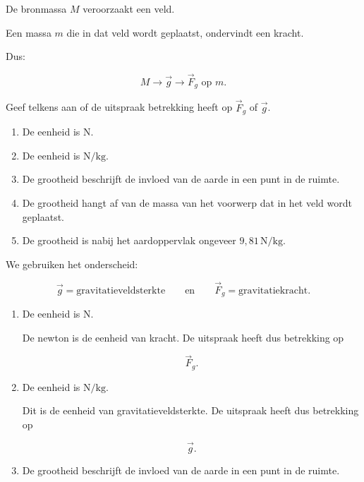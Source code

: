 \documentclass{ximera}
\begin{document}
De bronmassa $M$ veroorzaakt een veld.

Een massa $m$ die in dat veld wordt geplaatst, ondervindt een kracht.

Dus:

\[
\boxed{
M
\longrightarrow
\vec g
\longrightarrow
\vec F_g\text{ op }m.
}
\]


\begin{oefening}{\oefB\ESS}

Geef telkens aan of de uitspraak betrekking heeft op $\vec F_g$ of
$\vec g$.

\begin{enumerate}
  \item De eenheid is $\mathrm N$.
  \item De eenheid is $\mathrm{N/kg}$.
  \item De grootheid beschrijft de invloed van de aarde in een punt in
        de ruimte.
  \item De grootheid hangt af van de massa van het voorwerp dat in het
        veld wordt geplaatst.
  \item De grootheid is nabij het aardoppervlak ongeveer
        $9{,}81\,\mathrm{N/kg}$.
\end{enumerate}

\begin{oplossing}

      We gebruiken het onderscheid:
      
      \[
      \boxed{
      \vec g
      =
      \text{gravitatieveldsterkte}
      }
      \qquad\text{en}\qquad
      \boxed{
      \vec F_g
      =
      \text{gravitatiekracht}.
      }
      \]
      
      \begin{enumerate}
      
        \item De eenheid is $\mathrm N$.
      
        De newton is de eenheid van kracht. De uitspraak heeft dus
        betrekking op
      
        \[
        \boxed{\vec F_g}.
        \]
      
      
        \item De eenheid is $\mathrm{N/kg}$.
      
        Dit is de eenheid van gravitatieveldsterkte. De uitspraak heeft dus
        betrekking op
      
        \[
        \boxed{\vec g}.
        \]
      
      
        \item De grootheid beschrijft de invloed van de aarde in een punt
        in de ruimte.
      

\end{enumerate}
\end{oplossing}
\end{oefening}
\end{document}
